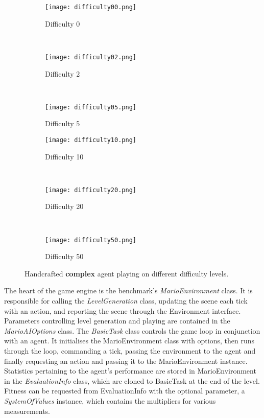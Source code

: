 \begin{figure}[t]
	\begin{adjustwidth}{-2cm}{-2cm}
    \centering
          \begin{subfigure}[b]{0.32\textwidth}
                  \centering
                  \texttt{[image: difficulty00.png]}
                  \caption{Difficulty 0}
          \end{subfigure}~
          \begin{subfigure}[b]{0.32\textwidth}
                  \centering
                  \texttt{[image: difficulty02.png]}
                  \caption{Difficulty 2}
          \end{subfigure}~
          \begin{subfigure}[b]{0.32\textwidth}
                  \centering
                  \texttt{[image: difficulty05.png]}
                  \caption{Difficulty 5}
          \end{subfigure}
          \begin{subfigure}[b]{0.32\textwidth}
                  \centering
                  \texttt{[image: difficulty10.png]}
                  \caption{Difficulty 10}
          \end{subfigure}~
          \begin{subfigure}[b]{0.32\textwidth}
                  \centering
                  \texttt{[image: difficulty20.png]}
                  \caption{Difficulty 20}
          \end{subfigure}~
          \begin{subfigure}[b]{0.32\textwidth}
                  \centering
                  \texttt{[image: difficulty50.png]}
                  \caption{Difficulty 50}
          \end{subfigure}
    \caption{Handcrafted \textbf{complex} agent playing on different difficulty levels.}\label{fig:lpdiff}
    \end{adjustwidth}
\end{figure}

The heart of the game engine is the benchmark's \emph{MarioEnvironment} class. It is responsible for calling the \emph{LevelGeneration} class, updating the scene each tick with an action, and reporting the scene through the Environment interface. Parameters controlling level generation and playing are contained in the \emph{MarioAIOptions} class.  The \emph{BasicTask} class controls the game loop in conjunction with an agent. It initialises the MarioEnvironment class with options, then runs through the loop, commanding a tick, passing the environment to the agent and finally requesting an action and passing it to the MarioEnvironment instance. Statistics pertaining to the agent's performance are stored in MarioEnvironment in the \emph{EvaluationInfo} class, which are cloned to BasicTask at the end of the level. Fitness can be requested from EvaluationInfo with the optional parameter, a \emph{SystemOfValues} instance, which contains the multipliers for various measurements.

